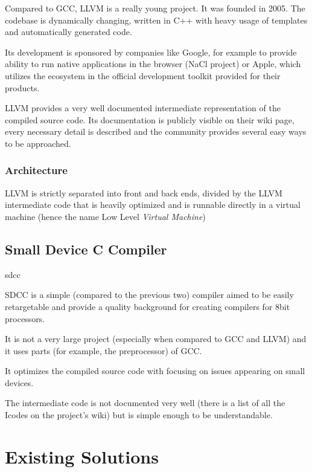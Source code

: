     Compared to GCC, LLVM is a really young project. It was founded in 2005. The codebase is dynamically changing, written in C++ with heavy usage of templates and automatically generated code.

    Its development is sponsored by companies like Google, for example to provide ability to run native applications in the browser (NaCl project) or Apple, which utilizes the ecosystem in the official development toolkit provided for their products.

    LLVM provides a very well documented intermediate representation of the compiled source code. Its documentation is publicly visible on their wiki page, every necessary detail is described and the community provides several easy ways to be approached.

        \subsection{Architecture}

        LLVM is strictly separated into front and back ends, divided by the LLVM intermediate code that is heavily optimized and is runnable directly in a virtual machine (hence the name Low Level \emph{Virtual Machine})

    \section{Small Device C Compiler}{sdcc}

    SDCC is a simple (compared to the previous two) compiler aimed to be easily retargetable and provide a quality background for creating compilers for 8bit processors.

    It is not a very large project (especially when compared to GCC and LLVM) and it uses parts (for example, the preprocessor) of GCC.

    It optimizes the compiled source code with focusing on issues appearing on small devices.

    The intermediate code is not documented very well (there is a list of all the Icodes on the project's wiki) but is simple enough to be understandable.


\chapter{Existing Solutions}\label{existing}

